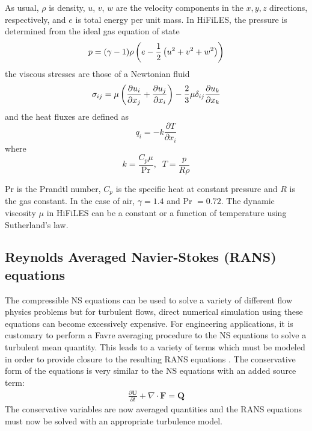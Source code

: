 As usual, $\rho$ is density, $u$, $v$, $w$ are the velocity components in the $x, y, z$ directions, respectively, and $e$ is total energy per unit mass. In HiFiLES, the pressure is determined from the ideal gas equation of state
\begin{equation}
p = (\gamma - 1)\rho\left(e - \frac{1}{2}\left(u^2 + v^2 + w^2\right)\right)
\end{equation}
the viscous stresses are those of a Newtonian fluid
\begin{equation}
\sigma_{ij} = \mu\left( \frac{\partial u_i}{\partial x_j}
+ \frac{\partial u_j}{\partial x_i} \right)
- \frac{2}{3}\mu \delta_{ij}\frac{\partial u_k}{\partial x_k}
\end{equation}
and the heat fluxes are defined as
\begin{equation}
q_i = -k \frac{\partial T}{\partial x_i}
\end{equation}
where
\begin{equation}
k = \frac{C_p \mu}{\text{Pr}} , \;\; T = \frac{p}{R \rho}
\end{equation}

Pr is the Prandtl number, $C_p$ is the specific heat at constant pressure and $R$ is the gas constant. In the case of air, $\gamma = 1.4$ and Pr $= 0.72$. The dynamic viscosity $\mu$ in HiFiLES can be a constant or a function of temperature using Sutherland's law.


\subsection{Reynolds Averaged Navier-Stokes (RANS) equations}
The compressible NS equations can be used to solve a variety of different flow physics problems but for turbulent flows, direct numerical simulation using these equations can become excessively expensive. For engineering applications, it is customary to perform a Favre averaging procedure to the NS equations to solve a turbulent mean quantity. This leads to a variety of terms which must be modeled in order to provide closure to the resulting RANS equations \cite{wilcox1998turbulence,oliver2008high}. The conservative form of the equations is very similar to the NS equations with an added source term:
\begin{align}
	\frac{\partial \boldsymbol{U}}{\partial t} + \nabla \cdot \boldsymbol{F} = \boldsymbol{Q}
\end{align}
The conservative variables are now averaged quantities and the RANS equations must now be solved with an appropriate turbulence model.
